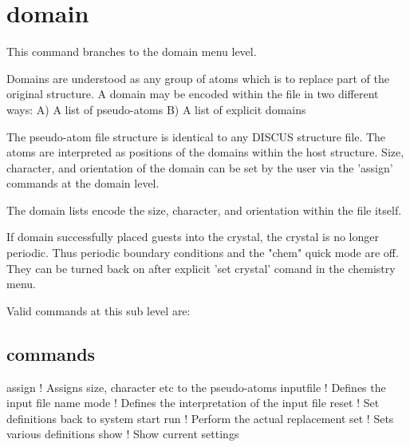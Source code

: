 \section{domain}
\par
This command branches to the domain menu level. 
\par
Domains are understood as any group of atoms which is to replace 
part of the original structure. A domain may be encoded within the 
file in two different ways: 
A) A list of pseudo-atoms 
B) A list of explicit domains 
\par
The pseudo-atom file structure is identical to any DISCUS structure 
file. The atoms are interpreted as positions of the domains within 
the host structure. Size, character, and orientation of the domain 
can be set by the user via the 'assign' commands at the domain level. 
\par
The domain lists encode the size, character, and orientation within 
the file itself. 
\par
If domain successfully placed guests into the crystal, the crystal 
is no longer periodic. Thus periodic boundary conditions and 
the "chem" quick mode are off. They can be turned back on after 
explicit 'set crystal' comand in the chemistry menu. 
\par
Valid commands at this sub level are: 
\subsection*{commands}
\par
\begin{MacVerbatim}
assign     ! Assigns size, character etc to the pseudo-atoms
inputfile  ! Defines the input file name
mode       ! Defines the interpretation of the input file
reset      ! Set definitions back to system start
run        ! Perform the actual replacement
set        ! Sets various definitions
show       ! Show current settings
\end{MacVerbatim}
